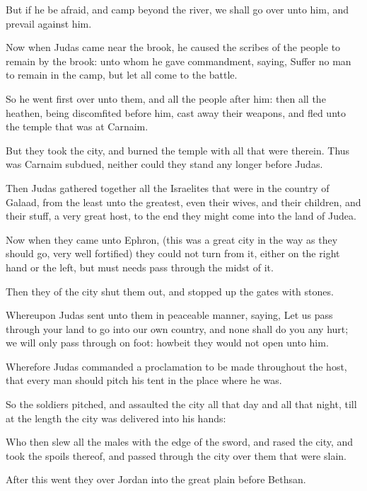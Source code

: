 {\par }{\PP {}But if he be afraid, and camp beyond the river, we shall go over unto him, and prevail against him.
\par }{\PP {}Now when Judas came near the brook, he caused the scribes of the people to remain by the brook: unto whom he gave commandment, saying, Suffer no man to remain in the camp, but let all come to the battle.
\par }{\PP {}So he went first over unto them, and all the people after him: then all the heathen, being discomfited before him, cast away their weapons, and fled unto the temple that was at Carnaim.
\par }{\PP {}But they took the city, and burned the temple with all that were therein. Thus was Carnaim subdued, neither could they stand any longer before Judas.
\par }{\PP {}Then Judas gathered together all the Israelites that were in the country of Galaad, from the least unto the greatest, even their wives, and their children, and their stuff, a very great host, to the end they might come into the land of Judea.
\par }{\PP {}Now when they came unto Ephron, (this was a great city in the way as they should go, very well fortified) they could not turn from it, either on the right hand or the left, but must needs pass through the midst of it.
\par }{\PP {}Then they of the city shut them out, and stopped up the gates with stones.
\par }{\PP {}Whereupon Judas sent unto them in peaceable manner, saying, Let us pass through your land to go into our own country, and none shall do you any hurt; we will only pass through on foot: howbeit they would not open unto him.
\par }{\PP {}Wherefore Judas commanded a proclamation to be made throughout the host, that every man should pitch his tent in the place where he was.
\par }{\PP {}So the soldiers pitched, and assaulted the city all that day and all that night, till at the length the city was delivered into his hands:
\par }{\PP {}Who then slew all the males with the edge of the sword, and rased the city, and took the spoils thereof, and passed through the city over them that were slain.
\par }{\PP {}After this went they over Jordan into the great plain before Bethsan.
}
